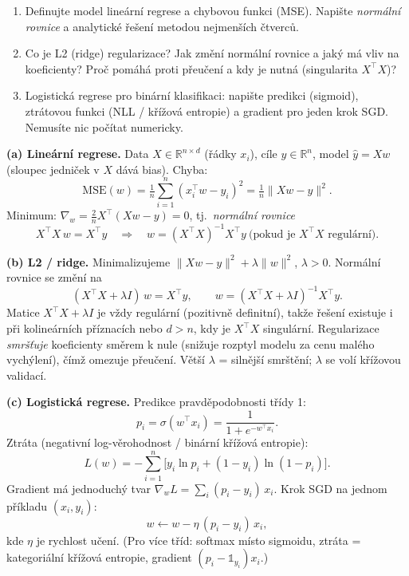 \begin{zadani}
\begin{enumerate}[label=(\alph*)]
  \item {} Definujte model lineární regrese a chybovou funkci (MSE). Napište \emph{normální rovnice} a analytické řešení metodou nejmenších čtverců.
  \item {} Co je L2 (ridge) regularizace? Jak změní normální rovnice a jaký má vliv na koeficienty? Proč pomáhá proti přeučení a kdy je nutná (singularita $X^{\!\top}X$)?
  \item {} Logistická regrese pro binární klasifikaci: napište predikci (sigmoid), ztrátovou funkci (NLL / křížová entropie) a gradient pro jeden krok SGD. Nemusíte nic počítat numericky.
\end{enumerate}
\end{zadani}

\begin{reseni}
\textbf{(a) Lineární regrese.} Data $X\in\mathbb{R}^{n\times d}$ (řádky $x_i$), cíle $y\in\mathbb{R}^n$, model $\hat y=Xw$ (sloupec jedniček v $X$ dává bias). Chyba:
\[
\mathrm{MSE}(w)=\tfrac1n\sum_{i=1}^n (x_i^{\!\top}w-y_i)^2=\tfrac1n\lVert Xw-y\rVert^2.
\]
Minimum: $\nabla_w=\tfrac2n X^{\!\top}(Xw-y)=0$, tj.\ \emph{normální rovnice}
\[
X^{\!\top}X\,w = X^{\!\top}y \quad\Rightarrow\quad w=(X^{\!\top}X)^{-1}X^{\!\top}y \ \text{(pokud je $X^{\!\top}X$ regulární).}
\]

\textbf{(b) L2 / ridge.} Minimalizujeme $\lVert Xw-y\rVert^2+\lambda\lVert w\rVert^2$, $\lambda>0$. Normální rovnice se změní na
\[
(X^{\!\top}X+\lambda I)\,w=X^{\!\top}y,\qquad w=(X^{\!\top}X+\lambda I)^{-1}X^{\!\top}y.
\]
Matice $X^{\!\top}X+\lambda I$ je vždy regulární (pozitivně definitní), takže řešení existuje i při kolineárních příznacích nebo $d>n$, kdy je $X^{\!\top}X$ singulární. Regularizace \emph{smršťuje} koeficienty směrem k nule (snižuje rozptyl modelu za cenu malého vychýlení), čímž omezuje přeučení. Větší $\lambda$ = silnější smrštění; $\lambda$ se volí křížovou validací.

\textbf{(c) Logistická regrese.} Predikce pravděpodobnosti třídy 1:
\[
p_i=\sigma(w^{\!\top}x_i)=\frac{1}{1+e^{-w^{\!\top}x_i}}.
\]
Ztráta (negativní log-věrohodnost / binární křížová entropie):
\[
L(w)=-\sum_{i=1}^n\big[y_i\ln p_i+(1-y_i)\ln(1-p_i)\big].
\]
Gradient má jednoduchý tvar $\nabla_w L=\sum_i (p_i-y_i)\,x_i$. Krok SGD na jednom příkladu $(x_i,y_i)$:
\[
w\leftarrow w-\eta\,(p_i-y_i)\,x_i,
\]
kde $\eta$ je rychlost učení. (Pro více tříd: softmax místo sigmoidu, ztráta = kategoriální křížová entropie, gradient $(p_i-\mathbb{1}_{y_i})x_i$.)
\end{reseni}

